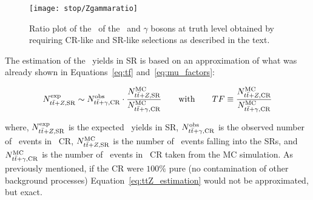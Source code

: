 		\begin{figure}[htpb]
		  \centering
		  \texttt{[image: stop/Zgammaratio]}
		  \caption{Ratio plot of the \pt\ of the \Zboson\ and $\gamma$ bosons at truth level obtained by requiring \ac{CR}-like and \ac{SR}-like selections as described in the text.}
		  \label{fig:ZGammaratio}
		\end{figure}

		The estimation of the \ttZ\ yields in \ac{SR} is based on an approximation of what was already shown in Equations~\ref{eq:tf} and~\ref{eq:mu_factors}:
		
		\begin{equation}
			N_{t\bar{t}+Z,\mathrm{SR}}^{\mathrm{exp}} \sim N_{t\bar{t}+\gamma,\mathrm{CR}}^{\mathrm{obs}} \cdot \frac{N_{t\bar{t}+Z,\mathrm{SR}}^{\mathrm{MC}}}{N_{t\bar{t}+\gamma,\mathrm{CR}}^{\mathrm{MC}}} \qquad \mathrm{with} \qquad TF \equiv \frac{N_{t\bar{t}+Z,\mathrm{CR}}^{\mathrm{MC}}}{N_{t\bar{t}+\gamma,\mathrm{CR}}^{\mathrm{MC}}}
		\label{eq:ttZ_estimation}
		\end{equation}

		\noindent where, $N_{t\bar{t}+Z,\mathrm{SR}}^{\mathrm{exp}}$ is the expected \ttZ\ yields in \ac{SR}, $N_{t\bar{t}+\gamma,\mathrm{CR}}^{\mathrm{obs}}$ is the observed number of \ttgamma\ events in \ttgamma\ \ac{CR}, $N_{t\bar{t}+Z,\mathrm{SR}}^{\mathrm{MC}}$ is the number of \ttZ\ events falling into the \acp{SR}, and $N_{t\bar{t}+\gamma,\mathrm{CR}}^{\mathrm{MC}}$ is the number of \ttgamma\ events in \ttgamma\ \ac{CR} taken from the \ac{MC} simulation. As previously mentioned, if the \ac{CR} were $100\%$ pure (no contamination of other background processes) Equation~\ref{eq:ttZ_estimation} would not be approximated, but exact.

